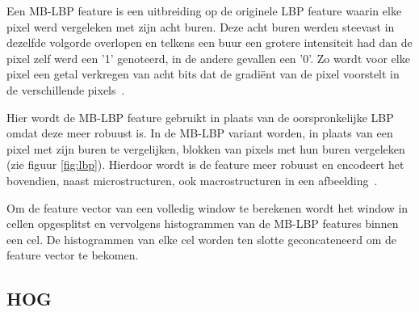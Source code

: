 Een MB-LBP feature is een uitbreiding op de originele LBP feature waarin elke pixel werd vergeleken met zijn acht buren. Deze acht buren werden steevast in dezelfde volgorde overlopen en telkens een buur een grotere intensiteit had dan de pixel zelf werd een '1' genoteerd, in de andere gevallen een '0'. Zo wordt voor elke pixel een getal verkregen van acht bits dat de gradi\"ent van de pixel voorstelt in de verschillende pixels~\cite{ojala1996comparative}.

Hier wordt de MB-LBP feature gebruikt in plaats van de oorspronkelijke LBP omdat deze meer robuust is. In de MB-LBP variant worden, in plaats van een pixel met zijn buren te vergelijken, blokken van pixels met hun buren vergeleken (zie figuur \ref{fig:lbp}). Hierdoor wordt is de feature meer robuust en encodeert het bovendien, naast microstructuren, ook macrostructuren in een afbeelding~\cite{liao2007learning}. 

Om de feature vector van een volledig window te berekenen wordt het window in cellen opgesplitst en vervolgens histogrammen van de MB-LBP features binnen een cel. De histogrammen van elke cel worden ten slotte geconcateneerd om de feature vector te bekomen.

%

\subsection{HOG} \label{sec:feat_hog}

